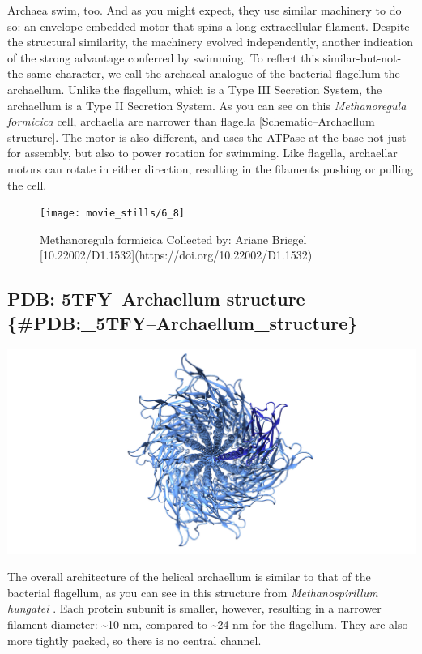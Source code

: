 \documentclass[]{tufte-book}
\begin{document}
Archaea swim, too. And as you might expect, they use similar machinery
to do so: an envelope-embedded motor that spins a long extracellular
filament. Despite the structural similarity, the machinery evolved
independently, another indication of the strong advantage conferred by
swimming. To reflect this similar-but-not-the-same character, we call
the archaeal analogue of the bacterial flagellum the archaellum. Unlike
the flagellum, which is a Type III Secretion System, the archaellum is a
Type II Secretion System. As you can see on this \emph{Methanoregula
formicica} cell, archaella are narrower than flagella
{[}Schematic--Archaellum structure{]}. The motor is also different, and
uses the ATPase at the base not just for assembly, but also to power
rotation for swimming. Like flagella, archaellar motors can rotate in
either direction, resulting in the filaments pushing or pulling the
cell.

\begin{figure}
\texttt{[image: movie\_stills/6\_8]} \caption[Methanoregula formicica Collected by]{Methanoregula formicica Collected by: Ariane Briegel [10.22002/D1.1532](https://doi.org/10.22002/D1.1532)}\label{fig:unnamed-chunk-113}
\end{figure}

\subsection{PDB: 5TFY--Archaellum structure
\{\#PDB:\_5TFY--Archaellum\_structure\}}\label{pdb-5tfyarchaellum-structure-pdb_5tfyarchaellum_structure}

\includegraphics{img/schematics/6_8_1}

The overall architecture of the helical archaellum is similar to that of
the bacterial flagellum, as you can see in this structure from
\emph{Methanospirillum hungatei} \citet{poweleit2016}. Each protein
subunit is smaller, however, resulting in a narrower filament diameter:
\textasciitilde{}10 nm, compared to \textasciitilde{}24 nm for the
flagellum. They are also more tightly packed, so there is no central
channel.
\end{document}
